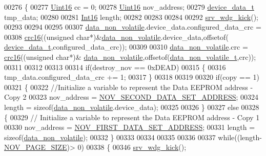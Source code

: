 \begin{DoxyCode}
00276 \{
00277     \hyperlink{a00072_a59a9f6be4562c327cbfb4f7e8e18f08b}{Uint16}         cc = 0;
00278     \hyperlink{a00072_a59a9f6be4562c327cbfb4f7e8e18f08b}{Uint16}         nov\_address;
00279     \hyperlink{a00022_a95029dff9c90f6a6907353ba86eb3f33}{device\_data\_t}  tmp\_data;
00280      
00281     \hyperlink{a00072_a659ce9e5eb6571f9984ffc7caad2660a}{Int16} length;
00282 
00283 
00284 
00292      \hyperlink{a00067_a710d148845397582739d170341f3d3d9}{srv\_wdg\_kick}();
00293     
00294     
00295     
00307     \hyperlink{a00060_a76ac5f917f5308dcd83de0d7c94559fb}{data\_non\_volatile}.device\_data.configured\_data\_crc =
00308     \hyperlink{a00060_a6553827687db2137ee550ad6e1d2f316}{crc16}((\textcolor{keywordtype}{unsigned} \textcolor{keywordtype}{char}*)&\hyperlink{a00060_a76ac5f917f5308dcd83de0d7c94559fb}{data\_non\_volatile}.device\_data,offsetof(
      \hyperlink{a00022_a95029dff9c90f6a6907353ba86eb3f33}{device\_data\_t},configured\_data\_crc));
00309 
00310     \hyperlink{a00060_a76ac5f917f5308dcd83de0d7c94559fb}{data\_non\_volatile}.crc = \hyperlink{a00060_a6553827687db2137ee550ad6e1d2f316}{crc16}((\textcolor{keywordtype}{unsigned} \textcolor{keywordtype}{char}*)&
      \hyperlink{a00060_a76ac5f917f5308dcd83de0d7c94559fb}{data\_non\_volatile},offsetof(\hyperlink{a00022_a8e66478e65e03ebc9434466e51c0ad0b}{data\_non\_volatile\_t},crc));
00311 
00312 
00313 
00314     \textcolor{keywordflow}{if}(destroy\_nov == 0xDEAD)
00315     \{
00316         tmp\_data.configured\_data\_crc += 1;
00317     \}
00318 
00319 
00320     \textcolor{keywordflow}{if}(copy == 1)
00321     \{        
00322         \textcolor{comment}{//Initialize a variable to represent the Data EEPROM address - Copy 2}
00323        nov\_address = \hyperlink{a00029_ab062741a69ee7156fbdf317ec627b4ca}{NOV\_SECOND\_DATA\_SET\_ADDRESS};
00324        length = \textcolor{keyword}{sizeof}(\hyperlink{a00060_a76ac5f917f5308dcd83de0d7c94559fb}{data\_non\_volatile}.device\_data);
00325 
00326     \}
00327     \textcolor{keywordflow}{else}
00328     \{
00329        \textcolor{comment}{// Initialize a variable to represent the Data EEPROM address - Copy 1}
00330        nov\_address = \hyperlink{a00029_a3d5917eef9709c44acd2e6314619f440}{NOV\_FIRST\_DATA\_SET\_ADDRESS};
00331        length = \textcolor{keyword}{sizeof}(\hyperlink{a00060_a76ac5f917f5308dcd83de0d7c94559fb}{data\_non\_volatile});
00332     \}
00333            
00334 
00335     
00336 
00337     \textcolor{keywordflow}{while}((length-\hyperlink{a00029_aad44ced0f63ecf5d2ced5bc0bf220287}{NOV\_PAGE\_SIZE})> 0)
00338     \{
00346         \hyperlink{a00067_a710d148845397582739d170341f3d3d9}{srv\_wdg\_kick}();

\end{DoxyCode}
